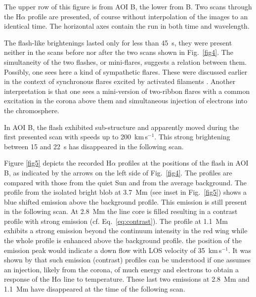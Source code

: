 The upper row of this figure is from AOI  B\arcmin, the lower from B. Two scans through the H$\alpha$ profile are presented, of course without interpolation of the images to an identical time. The horizontal axes contain the run in both time and wavelength. 

The flash-like brightenings lasted only for less than 45~s, they were present neither in the scans before nor after the two scans shown in Fig.~\ref{fig4}. The simultaneity of the two flashes, or mini-flares, suggests a relation between them. Possibly, one sees here a kind of sympathetic flares. These were discussed earlier in the context of synchronous flares excited by activated filaments \citep{1977ASSL...69...97T}. Another interpretation is that one sees a mini-version of two-ribbon flares with a common excitation in the corona above them and simultaneous injection of electrons into the chromosphere.

In AOI B, the flash exhibited sub-structure and apparently moved during the first presented scan with speeds up to 200~km\,s$^{-1}$. This strong brightening between 15 and 22~s has disappeared in the following scan. 

Figure \ref{fig5} depicts the recorded H$\alpha$ profiles at the positions of the flash in AOI B, as indicated by the arrows on the left side of Fig.~\ref{fig4}. The profiles are compared with those from the quiet Sun and from the average background. The profile from the isolated bright blob at 3.7~Mm (see inset in Fig.~\ref{fig5}) shows a blue shifted emission above the background profile. This emission is still present in the following scan. At 2.8~Mm the line core is filled resulting in a contrast profile with strong emission (cf. Eq.~\ref{eq:contrast}). The profile at 1.1~Mm exhibits a strong emission beyond the continuum intensity in the red wing while the whole profile is enhanced above the background profile. the position of the emission peak would indicate a down flow with LOS velocity of 35~km\,s$^{-1}$. It was shown by \citet{2004A&A...418.1131A} that such emission (contrast) profiles can be understood if one assumes an injection, likely from the corona, of much energy and electrons to obtain a response of the H$\alpha$ line to temperature. These last two emissions at 2.8~Mm and 1.1~Mm have disappeared at the time of the following scan.

